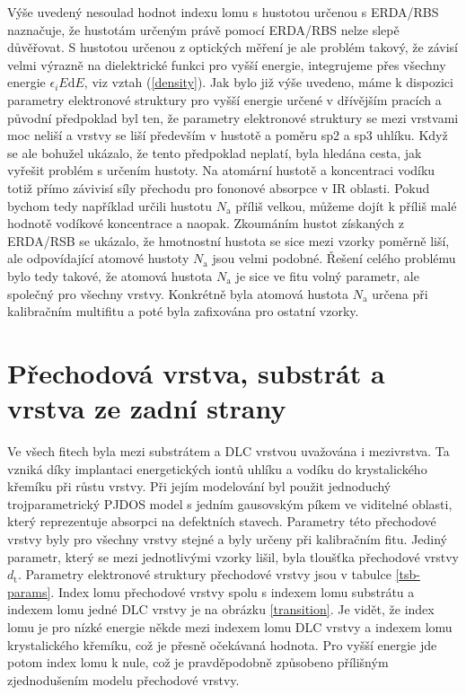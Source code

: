 Výše uvedený nesoulad hodnot indexu lomu s hustotou určenou s ERDA/RBS naznačuje, že hustotám určeným právě pomocí ERDA/RBS nelze slepě důvěřovat. S hustotou určenou z optických měření je ale problém takový, že závisí velmi výrazně na dielektrické funkci pro vyšší energie, integrujeme přes všechny energie $\epsilon_i E \mathrm{d}E$, viz vztah (\ref{density}). 
Jak bylo již výše uvedeno, máme k dispozici parametry elektronové struktury pro vyšší energie určené v dřívějším pracích a původní předpoklad byl ten, že parametry elektronové struktury se mezi vrstvami moc neliší a vrstvy se liší především v hustotě a poměru sp2 a sp3 uhlíku. Když se ale bohužel ukázalo, že tento předpoklad neplatí, byla hledána cesta, jak vyřešit problém s určením hustoty. Na atomární hustotě a koncentraci vodíku totiž přímo závivisí síly přechodu pro fononové absorpce v IR oblasti. 
Pokud bychom tedy například určili hustotu $N_\mathrm{a}$ příliš velkou, můžeme dojít k příliš malé hodnotě vodíkové koncentrace a naopak. Zkoumáním hustot získaných z ERDA/RSB se ukázalo, že hmotnostní hustota se sice mezi vzorky poměrně liší, ale odpovídající atomové hustoty $N_\mathrm{a}$ jsou velmi podobné. 
Řešení celého problému bylo tedy takové, že atomová hustota $N_\mathrm{a}$ je sice ve fitu volný parametr, ale společný pro všechny vrstvy. Konkrétně byla atomová hustota $N_\mathrm{a}$ určena při kalibračním multifitu a poté byla zafixována pro ostatní vzorky.

\section{Přechodová vrstva, substrát a vrstva ze zadní strany}
Ve všech fitech byla mezi substrátem a DLC vrstvou uvažována i mezivrstva. Ta vzniká díky implantaci energetických iontů uhlíku a vodíku do krystalického křemíku při růstu vrstvy. 
Při jejím modelování byl použit jednoduchý trojparametrický PJDOS model s jedním gausovským píkem ve viditelné oblasti, který reprezentuje absorpci na defektních stavech. 
Parametry této přechodové vrstvy byly pro všechny vrstvy stejné a byly určeny při kalibračním fitu. Jediný parametr, který se mezi jednotlivými vzorky lišil, byla tloušťka přechodové vrstvy $d_\mathrm{t}$. 
Parametry elektronové struktury přechodové vrstvy jsou v tabulce \ref{tsb-params}. Index lomu přechodové vrstvy spolu s indexem lomu substrátu a indexem lomu jedné DLC vrstvy je na obrázku \ref{transition}. 
Je vidět, že index lomu je pro nízké energie někde mezi indexem lomu DLC vrstvy a indexem lomu krystalického křemíku, což je přesně očekávaná hodnota. Pro vyšší energie jde potom index lomu k nule, což je pravděpodobně způsobeno přílišným zjednodušením modelu přechodové vrstvy.

